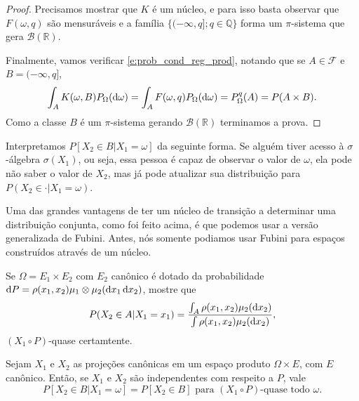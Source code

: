 \begin{proof}
  Precisamos mostrar que $K$ é um núcleo, e para isso basta observar que $F(\omega, q)$ são mensuráveis e a família $\{(-\infty, q]; q \in \mathbb{Q}\}$ forma um $\pi$-sistema que gera $\mathcal{B}(\mathbb{R})$.

  Finalmente, vamos verificar \eqref{e:prob_cond_reg_prod}, notando que se $A \in \mathcal{F}$ e $B = (-\infty, q]$,
  \begin{equation}
    \int_A K(\omega, B) P_\Omega(\mathop{}\!\mathrm{d} \omega) = \int_A F(\omega, q) P_\Omega (\mathop{}\!\mathrm{d} \omega) = P^q_\Omega(A) = P(A \times B).
  \end{equation}
  Como a classe $B$ é um $\pi$-sistema gerando $\mathcal{B}(\mathbb{R})$ terminamos a prova.
\end{proof}

Interpretamos $P[X_2 \in B | X_1 = \omega]$ da seguinte forma.
Se alguém tiver acesso à $\sigma$-álgebra $\sigma(X_1)$, ou seja, essa pessoa é capaz de observar o valor de $\omega$, ela pode não saber o valor de $X_2$, mas já pode atualizar sua distribuição para $P(X_2 \in \cdot| X_1 = \omega)$.

Uma das grandes vantagens de ter um núcleo de transição a determinar uma distribuição conjunta, como foi feito acima, é que podemos usar a versão generalizada de Fubini.
Antes, nós somente podiamos usar Fubini para espaços construídos através de um núcleo.

\begin{exercise}
  Se $\Omega = E_1 \times E_2$ com $E_2$ canônico é dotado da probabilidade $\mathop{}\!\mathrm{d} P = \rho(x_1, x_2) \mu_1 \otimes \mu_2 (\mathop{}\!\mathrm{d} x_1 \mathop{}\!\mathrm{d} x_2)$, mostre que
  \begin{equation}
    P(X_2 \in A|X_1 = x_1) = \frac{\int_A \rho(x_1, x_2) \mu_2(\mathop{}\!\mathrm{d} x_2)}{\int \rho(x_1, x_2) \mu_2(\mathop{}\!\mathrm{d} x_2)},
  \end{equation}
  $(X_1 \circ P)$-quase certamtente.
\end{exercise}

\begin{exercise}
  \label{x:prob_cond_reg_indep}
  Sejam $X_1$ e $X_2$ as projeções canônicas em um espaço produto $\Omega \times E$, com $E$ canônico.
  Então, se $X_1$ e $X_2$ são independentes com respeito a $P$, vale
  \begin{equation}
    P[X_2 \in B | X_1 = \omega] = P[X_2 \in B] \text{ para $(X_1 \circ P)$-quase todo $\omega$}.
  \end{equation}
\end{exercise}


